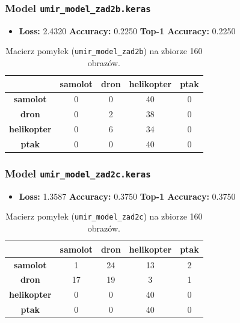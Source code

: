 \noindent



\subsubsection*{Model \texttt{umir\_model\_zad2b.keras}}
\begin{itemize}
    \item \textbf{Loss:} 2.4320 \quad \textbf{Accuracy:} 0.2250 \quad \textbf{Top-1 Accuracy:} 0.2250
\end{itemize}

\begin{table}[H]
\centering
\caption{Macierz pomyłek (\texttt{umir\_model\_zad2b}) na zbiorze 160 obrazów.}
\begin{tabular}{c|cccc}
\hline
 & \textbf{samolot} & \textbf{dron} & \textbf{helikopter} & \textbf{ptak}\\
\hline
\textbf{samolot}     & 0 &  0 & 40 &  0 \\
\textbf{dron}        & 0 &  2 & 38 &  0 \\
\textbf{helikopter}  & 0 &  6 & 34 &  0 \\
\textbf{ptak}        & 0 &  0 & 40 &  0 \\
\hline
\end{tabular}
\end{table}

\noindent


\subsubsection*{Model \texttt{umir\_model\_zad2c.keras}}
\begin{itemize}
    \item \textbf{Loss:} 1.3587 \quad \textbf{Accuracy:} 0.3750 \quad \textbf{Top-1 Accuracy:} 0.3750
\end{itemize}

\begin{table}[H]
\centering
\caption{Macierz pomyłek (\texttt{umir\_model\_zad2c}) na zbiorze 160 obrazów.}
\begin{tabular}{c|cccc}
\hline
 & \textbf{samolot} & \textbf{dron} & \textbf{helikopter} & \textbf{ptak}\\
\hline
\textbf{samolot}     &  1 & 24 & 13 &  2 \\
\textbf{dron}        & 17 & 19 &  3 &  1 \\
\textbf{helikopter}  &  0 &  0 & 40 &  0 \\
\textbf{ptak}        &  0 &  0 & 40 &  0 \\
\hline
\end{tabular}
\end{table}

